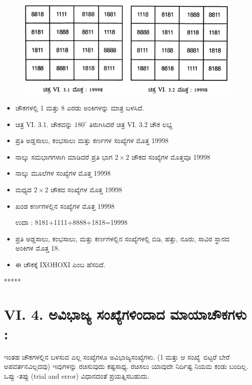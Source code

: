 \begin{figure}[H]
\includegraphics[scale=.9]{src/figures/chap5/fig5-3.jpg}
\end{figure}
\begin{itemize}
	\item ಚೌಕಗಳಲ್ಲಿ 1 ಮತ್ತು 8 ಎರಡು ಅಂಕಿಗಳನ್ನು ಮಾತ್ರ ಬಳಸಿದೆ.
	\item ಚಿತ್ರ VI. 3.1. ಚೌಕವನ್ನು $180^\circ$ ತಿರುಗಿಸಿದರೆ ಚಿತ್ರ VI. 3.2 ಚೌಕ ಲಭ್ಯ
	\item ಪ್ರತಿ ಅಡ್ಡಸಾಲು, ಕಂಭಸಾಲು ಮತ್ತು ಕರ್ಣಗಳ ಸಂಖ್ಯೆಗಳ ಮೊತ್ತ 19998
	\item ನಾಲ್ಕು ಸಮಭಾಗಗಳಾಗಿ ಮಾಡಿದರೆ ಪ್ರತಿ ಭಾಗ $2 \times 2$ ಚೌಕದ ಸಂಖ್ಯೆಗಳ ಮೊತ್ತವೂ 19998
	\item ನಾಲ್ಕು ಮೂಲೆಗಳ ಸಂಖ್ಯೆಗಳ ಮೊತ್ತ 19998
	\item ಮಧ್ಯದ $2 \times 2$ ಚೌಕದ ಸಂಖ್ಯೆಗಳ ಮೊತ್ತ 19998
	\item ಖಂಡ ಕರ್ಣಗಳಲ್ಲಿನ ಸಂಖ್ಯೆಗಳ ಮೊತ್ತ 19998

	ಉದಾ : 8181+1111+8888+1818=19998
	\item ಪ್ರತಿ ಅಡ್ಡಸಾಲು, ಕಂಭಸಾಲು, ಮತ್ತು ಕರ್ಣಗಳಲ್ಲಿನ ಸಂಖ್ಯೆಗಳಲ್ಲಿ ಬಿಡಿ, ಹತ್ತು, ನೂರು, ಸಾವಿರ ಸ್ಥಾನದ ಅಂಕಿಗಳ ಮೊತ್ತ 18.
	\item ಈ ಚೌಕಕ್ಕೆ IXOHOXI ಎಂಬ ಹೆಸರಿದೆ.
\end{itemize}
\begin{center}
*****
\end{center}

\section*{VI. 4. ಅವಿಭಾಜ್ಯ ಸಂಖ್ಯೆಗಳಿಂದಾದ ಮಾಯಾಚೌಕಗಳು :}

ಇಂತಹ ಚೌಕಗಳಲ್ಲಿನ ಬಳಸುವ ಎಲ್ಲ ಸಂಖ್ಯೆಗಳೂ ಅವಿಭಾಜ್ಯಸಂಖ್ಯೆಗಳು. (1 ಮತ್ತು ಆ \hbox{ಸಂಖ್ಯೆ ಬಿಟ್ಟರೆ} ಬೇರೆ ಅಪವರ್ತನವಿಲ್ಲದವು) ಇವುಗಳನ್ನು ರಚಿಸುವುದು ಕಷ್ಟಸಾಧ್ಯ. ರಚಿಸಲು ಯಾವುದೇ ನಿರ್ದಿಷ್ಟ ನಿಯಮ ಕಂಡು ಬಂದಿಲ್ಲ. ಒಪ್ಪು -ತಪ್ಪು (trial and error) ವಿಧಾನದಂತೆ ಪ್ರಯತ್ನಿಸಬಹುದು.

